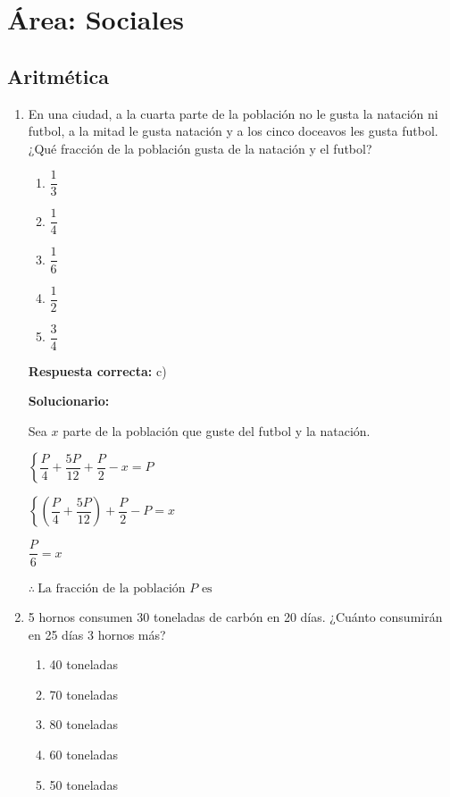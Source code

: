 \section*{Área: Sociales}




\subsection*{Aritmética}

\begin{enumerate}



	\item En una ciudad, a la cuarta parte de la población no le gusta la natación ni futbol,
	a la mitad le gusta natación y a los cinco doceavos les gusta futbol.
	¿Qué fracción de la población gusta de la natación y el futbol?

	\begin{enumerate}[label=\alph*)]
		\item $\dfrac{1}{3}$
		\item $\dfrac{1}{4}$
		\item $\dfrac{1}{6}$
		\item $\dfrac{1}{2}$
		\item $\dfrac{3}{4}$
	\end{enumerate}

	\textbf{Respuesta correcta:} c)

	\vspace{2mm}
	\textbf{Solucionario:}

	Sea $x$ parte de la población que guste del futbol y la natación.

	$\left\{\dfrac{P}{4}+\dfrac{5P}{12}+\dfrac{P}{2}-x=P\right.$

	$\left\{\left(\dfrac{P}{4}+\dfrac{5P}{12}\right)+\dfrac{P}{2}-P=x\right.$

	$\dfrac{P}{6}=x$

	$\therefore\ \text{La fracción de la población $P$ es } $

	\item 5 hornos consumen 30 toneladas de carbón en 20 días.
	¿Cuánto consumirán en 25 días 3 hornos más?

	\begin{enumerate}[label=\alph*)]
		\item 40 toneladas
		\item 70 toneladas
		\item 80 toneladas
		\item 60 toneladas
		\item 50 toneladas
	\end{enumerate}


\end{enumerate}
